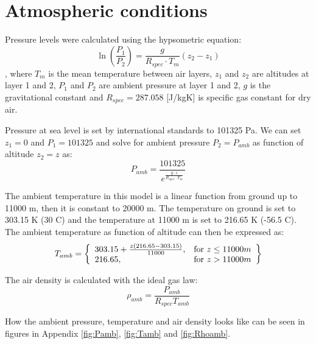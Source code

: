 \documentclass[english]{kththesis}
\begin{document}
\section{Atmospheric conditions}
\label{sec:Atmosphere}
Pressure levels were calculated using the hypsometric equation:
\begin{equation}
\label{eq:Hypsometric}
\ln \left( \frac{P_1}{P_2} \right) = \frac{g}{R_{spec}\cdot T_m} (z_2-z_1)
\end{equation}
, where $T_m$ is the mean temperature between air layers, $z_1$ and $z_2$ are altitudes at layer 1 and 2, $P_1$ and $P_2$ are ambient pressure at layer 1 and 2, $g$ is the gravitational constant and $R_{spec}=287.058$ [J/kgK] is specific gas constant for dry air.

Pressure at sea level is set by international standards to 101325 Pa. We can set $z_1=0$ and $P_1=101325$ and solve for ambient pressure $P_2=P_{amb}$ as function of altitude $z_2=z$ as:
\begin{equation}
\label{eq:Pamb}
P_{amb} = \frac{101325}{e^{ \frac{g\cdot z}{R_{spec}\cdot T_m} }}
\end{equation}

The ambient temperature in this model is a linear function from ground up to 11000 m, then it is constant to 20000 m. The temperature on ground is set to 303.15 K (30 \degree C) and the temperature at 11000 m is set to 216.65 K (-56.5 \degree C). The ambient temperature as function of altitude can then be expressed as:
\begin{equation}
\label{eq:Tamb}
 T_{amb} = \left\{\begin{array}{l r}
        303.15 + \frac{z(216.65-303.15)}{11000} , & \text{for } z\leq 11000 m\\
        216.65, & \text{for } z > 11000 m
        \end{array}\right\}
\end{equation}

The air density is calculated with the ideal gas law:
\begin{equation}
\label{eq:Rhoamb}
\rho_{amb} = \frac{P_{amb}}{R_{spec} T_{amb}}
\end{equation}

How the ambient pressure, temperature and air density looks like can be seen in figures in Appendix \ref{fig:Pamb}, \ref{fig:Tamb} and \ref{fig:Rhoamb}.
\end{document}
